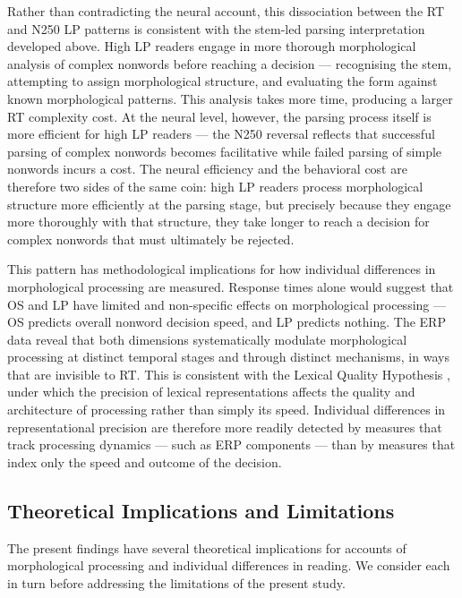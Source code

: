 \documentclass[utf8]{FrontiersinHarvard} %
\begin{document}
	Rather than contradicting the neural account, this dissociation between the RT and N250 LP patterns is consistent with the stem-led parsing interpretation developed above. High LP readers engage in more thorough morphological analysis of complex nonwords before reaching a decision --- recognising the stem, attempting to assign morphological structure, and evaluating the form against known morphological patterns. This analysis takes more time, producing a larger RT complexity cost. At the neural level, however, the parsing process itself is more efficient for high LP readers --- the N250 reversal reflects that successful parsing of complex nonwords becomes facilitative while failed parsing of simple nonwords incurs a cost. The neural efficiency and the behavioral cost are therefore two sides of the same coin: high LP readers process morphological structure more efficiently at the parsing stage, but precisely because they engage more thoroughly with that structure, they take longer to reach a decision for complex nonwords that must ultimately be rejected.
	
	This pattern has methodological implications for how individual differences in morphological processing are measured. Response times alone would suggest that OS and LP have limited and non-specific effects on morphological processing --- OS predicts overall nonword decision speed, and LP predicts nothing. The ERP data reveal that both dimensions systematically modulate morphological processing at distinct temporal stages and through distinct mechanisms, in ways that are invisible to RT. This is consistent with the Lexical Quality Hypothesis \citep{Perfetti2007}, under which the precision of lexical representations affects the quality and architecture of processing rather than simply its speed. Individual differences in representational precision are therefore more readily detected by measures that track processing dynamics --- such as ERP components --- than by measures that index only the speed and outcome of the decision.
	
	\subsection{Theoretical Implications and Limitations}
	
	The present findings have several theoretical implications for accounts of morphological processing and individual differences in reading. We consider each in turn before addressing the limitations of the present study.
	
\end{document}

